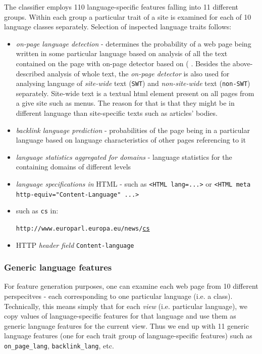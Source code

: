 \documentclass{acm_proc_article-sp}
\begin{document}
{  The classifier employs 110 language-specific features falling into 11 different  groups. Within each group a
  particular trait of a site is examined for each of 10 language classes separately. Selection of
  inspected language traits follows: 
  \begin{itemize}
    \item \textit{on-page language detection} - 
      determines the probability of a web page being written in some particular
      language based on analysis of all the text
      contained on the page with on-page detector based on (\cite{Rehurek:languageidentification} . 
      Besides the above-described analysis of whole text, the \textit{on-page 
      detector} is also used for analysing language of \textit{site-wide} text (\texttt{SWT}) and
    \textit{non-site-wide} text (\texttt{non-SWT}) separately. Site-wide text is a textual html element 
    present on all pages from a give site such as menus. The reason for that is that they might be 
    in different language than site-specific texts such as articles' bodies.
    \item \textit{backlink language prediction} - probabilities of the page being in a particular
      language based on language characteristics of other pages referencing to it 
    \item \textit{language statistics aggregated for domains} - language statistics for the
      containing domains of different levels
    \item \textit{language specifications in} HTML - such as \texttt{<HTML lang=...>} or \texttt{<HTML
      meta http-equiv="Content-Language"  ...>}
    \item {} such as \texttt{cs} in:

    \texttt{http://www.europarl.europa.eu/news/}\underline{\texttt{cs}} 
    \item HTTP \textit{header field} \texttt{Content-language}
  \end{itemize}


 \subsubsection{Generic language features}
    For feature generation purposes, one can examine each web page from 10 different perspecitves -
    each corresponding to one particular language (i.e. a class).
   Technically, this means simply
    that for each \textit{view} (i.e. particular language), we copy values of language-specific
    features for that language and use them as generic language features for the current view. Thus
    we end up with 11 generic language features (one for each trait group of language-specific
    features) such as \texttt{on\_page\_lang}, \texttt{backlink\_lang}, etc.
}
\end{document}
